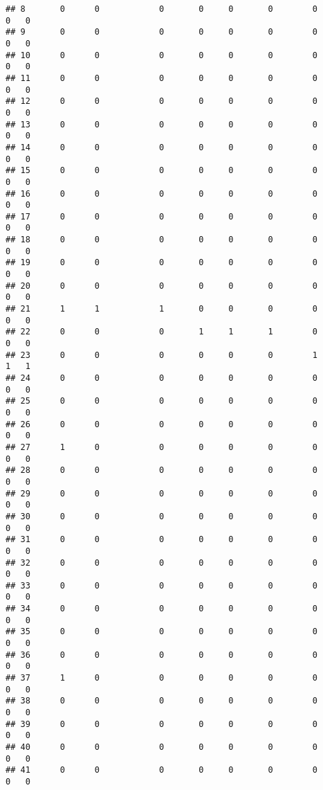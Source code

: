 \documentclass[
]{article}
\begin{document}
\begin{verbatim}
## 8       0      0            0       0     0       0        0         0   0
## 9       0      0            0       0     0       0        0         0   0
## 10      0      0            0       0     0       0        0         0   0
## 11      0      0            0       0     0       0        0         0   0
## 12      0      0            0       0     0       0        0         0   0
## 13      0      0            0       0     0       0        0         0   0
## 14      0      0            0       0     0       0        0         0   0
## 15      0      0            0       0     0       0        0         0   0
## 16      0      0            0       0     0       0        0         0   0
## 17      0      0            0       0     0       0        0         0   0
## 18      0      0            0       0     0       0        0         0   0
## 19      0      0            0       0     0       0        0         0   0
## 20      0      0            0       0     0       0        0         0   0
## 21      1      1            1       0     0       0        0         0   0
## 22      0      0            0       1     1       1        0         0   0
## 23      0      0            0       0     0       0        1         1   1
## 24      0      0            0       0     0       0        0         0   0
## 25      0      0            0       0     0       0        0         0   0
## 26      0      0            0       0     0       0        0         0   0
## 27      1      0            0       0     0       0        0         0   0
## 28      0      0            0       0     0       0        0         0   0
## 29      0      0            0       0     0       0        0         0   0
## 30      0      0            0       0     0       0        0         0   0
## 31      0      0            0       0     0       0        0         0   0
## 32      0      0            0       0     0       0        0         0   0
## 33      0      0            0       0     0       0        0         0   0
## 34      0      0            0       0     0       0        0         0   0
## 35      0      0            0       0     0       0        0         0   0
## 36      0      0            0       0     0       0        0         0   0
## 37      1      0            0       0     0       0        0         0   0
## 38      0      0            0       0     0       0        0         0   0
## 39      0      0            0       0     0       0        0         0   0
## 40      0      0            0       0     0       0        0         0   0
## 41      0      0            0       0     0       0        0         0   0

\end{verbatim}
\end{document}
